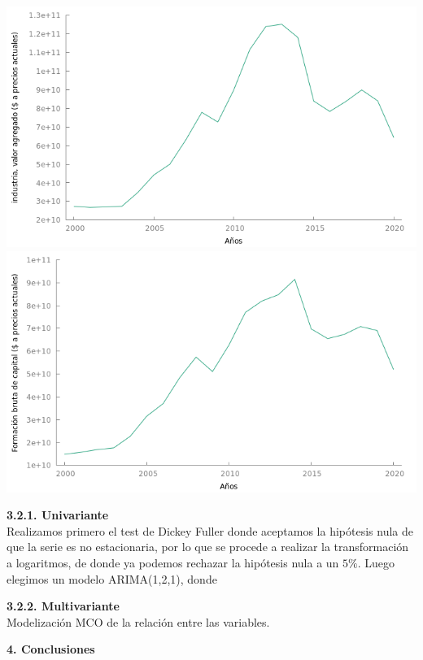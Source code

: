 \begin{table}[!htbp]
\begin{multicols}{2}
\includegraphics[scale=.33]{r/econometria2/image/IN.png}\\
\includegraphics[scale=.33]{r/econometria2/image/fbc.png}\\
\end{multicols}
\end{table}


\textbf{3.2.1. Univariante}\\

Realizamos primero el test de Dickey Fuller donde aceptamos la hipótesis nula de que la serie es no estacionaria, por lo que se procede a realizar la transformación a logaritmos, de donde ya podemos rechazar la hipótesis nula a un $5\%$. Luego elegimos un modelo ARIMA(1,2,1), donde 

\textbf{3.2.2. Multivariante}\\

Modelización MCO de la relación entre las variables. 

\textbf{4. Conclusiones}\\


